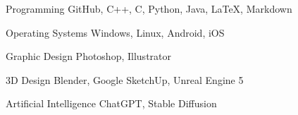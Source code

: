 


\begin{cvskills}




  \cvskill
    {Programming} %
    {GitHub, C++, C, Python, Java, LaTeX, Markdown} %

  \cvskill
    {Operating Systems} %
    {Windows, Linux, Android, iOS} %

  \cvskill
    {Graphic Design} %
    {Photoshop, Illustrator} %

  \cvskill
    {3D Design} %
    {Blender, Google SketchUp, Unreal Engine 5} %

  \cvskill
    {Artificial Intelligence} %
    {ChatGPT, Stable Diffusion} %


\end{cvskills}
